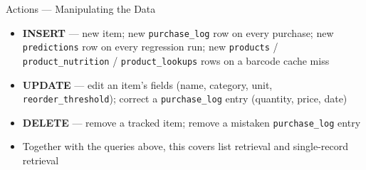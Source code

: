 \documentclass[aspectratio=169]{beamer}
\begin{document}
\begin{frame}{Actions --- Manipulating the Data}
  \begin{itemize}
    \item \textbf{INSERT} --- new item; new \texttt{purchase\_log} row on every purchase; new \texttt{predictions} row on every regression run; new \texttt{products} / \texttt{product\_nutrition} / \texttt{product\_lookups} rows on a barcode cache miss
    \item \textbf{UPDATE} --- edit an item's fields (name, category, unit, \texttt{reorder\_threshold}); correct a \texttt{purchase\_log} entry (quantity, price, date)
    \item \textbf{DELETE} --- remove a tracked item; remove a mistaken \texttt{purchase\_log} entry
    \item Together with the queries above, this covers list retrieval and single-record retrieval
  \end{itemize}
\end{frame}
\end{document}

